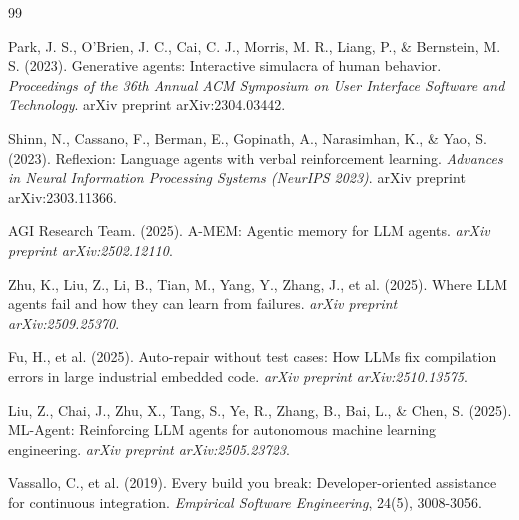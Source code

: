 \documentclass[11pt]{article}
\begin{document}
\newpage

\begin{thebibliography}{99}

Park, J. S., O'Brien, J. C., Cai, C. J., Morris, M. R., Liang, P., \& Bernstein, M. S. (2023).
Generative agents: Interactive simulacra of human behavior.
\textit{Proceedings of the 36th Annual ACM Symposium on User Interface Software and Technology}.
arXiv preprint arXiv:2304.03442.

Shinn, N., Cassano, F., Berman, E., Gopinath, A., Narasimhan, K., \& Yao, S. (2023).
Reflexion: Language agents with verbal reinforcement learning.
\textit{Advances in Neural Information Processing Systems (NeurIPS 2023)}.
arXiv preprint arXiv:2303.11366.

AGI Research Team. (2025).
A-MEM: Agentic memory for LLM agents.
\textit{arXiv preprint arXiv:2502.12110}.

Zhu, K., Liu, Z., Li, B., Tian, M., Yang, Y., Zhang, J., et al. (2025).
Where LLM agents fail and how they can learn from failures.
\textit{arXiv preprint arXiv:2509.25370}.

Fu, H., et al. (2025).
Auto-repair without test cases: How LLMs fix compilation errors in large industrial embedded code.
\textit{arXiv preprint arXiv:2510.13575}.

Liu, Z., Chai, J., Zhu, X., Tang, S., Ye, R., Zhang, B., Bai, L., \& Chen, S. (2025).
ML-Agent: Reinforcing LLM agents for autonomous machine learning engineering.
\textit{arXiv preprint arXiv:2505.23723}.

Vassallo, C., et al. (2019).
Every build you break: Developer-oriented assistance for continuous integration.
\textit{Empirical Software Engineering}, 24(5), 3008-3056.

\end{thebibliography}
\end{document}
